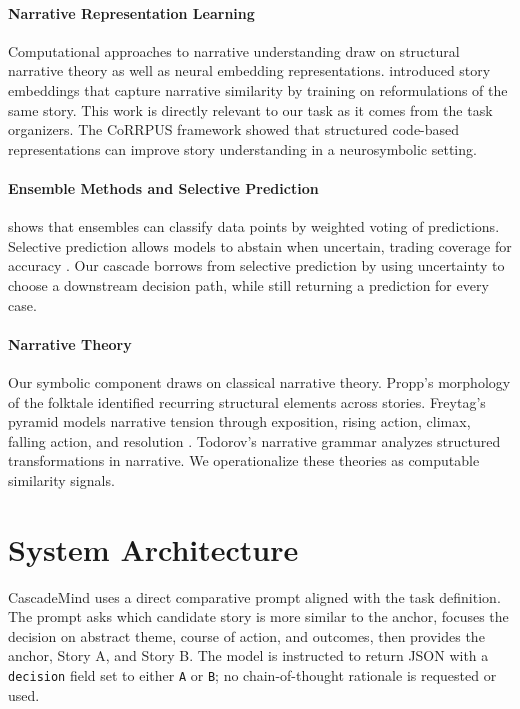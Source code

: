 \documentclass[11pt]{article}
\begin{document}
\paragraph{Narrative Representation Learning}
Computational approaches to narrative understanding draw on structural narrative theory \citep{propp1968morphology,thorndyke1977storygrammar} as well as neural embedding representations. \citet{hatzel2024story} introduced story embeddings that capture narrative similarity by training on reformulations of the same story. This work is directly relevant to our task as it comes from the task organizers. The CoRRPUS framework \citep{dong2023corrpus} showed that structured code-based representations can improve story understanding in a neurosymbolic setting.

\paragraph{Ensemble Methods and Selective Prediction}
\citet{dietterich2000ensemble} shows that ensembles can classify data points by weighted voting of predictions. Selective prediction allows models to abstain when uncertain, trading coverage for accuracy \citep{geifman2017selective}. Our cascade borrows from selective prediction by using uncertainty to choose a downstream decision path, while still returning a prediction for every case.

\paragraph{Narrative Theory}
Our symbolic component draws on classical narrative theory. Propp's morphology of the folktale \citep{propp1968morphology} identified recurring structural elements across stories. Freytag's pyramid models narrative tension through exposition, rising action, climax, falling action, and resolution \citep{freytag1894technik}. Todorov's narrative grammar \citep{todorov1969grammaire} analyzes structured transformations in narrative. We operationalize these theories as computable similarity signals.


\section{System Architecture}
CascadeMind uses a direct comparative prompt aligned with the task definition. The prompt asks which candidate story is more similar to the anchor, focuses the decision on abstract theme, course of action, and outcomes, then provides the anchor, Story A, and Story B. The model is instructed to return JSON with a \texttt{decision} field set to either \texttt{A} or \texttt{B}; no chain-of-thought rationale is requested or used.
\end{document}
